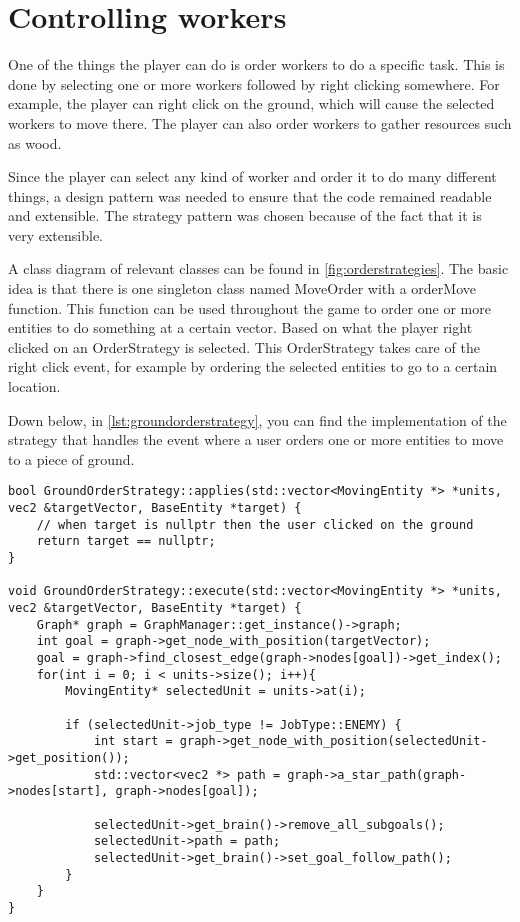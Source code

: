 \section{Controlling workers}

One of the things the player can do is order workers to do a specific task.
This is done by selecting one or more workers followed by right clicking
somewhere. For example, the player can right click on the ground, which will
cause the selected workers to move there. The player can also order workers
to gather resources such as wood.

Since the player can select any kind of worker and order it to do many
different things, a design pattern was needed to ensure that the code
remained readable and extensible. The strategy pattern was chosen because of
the fact that it is very extensible.

A class diagram of relevant classes can be found in
\cref{fig:orderstrategies}. The basic idea is that there is one singleton
class named MoveOrder with a orderMove function. This function can be used
throughout the game to order one or more entities to do something at a
certain vector. Based on what the player right clicked on an OrderStrategy
is selected. This OrderStrategy takes care of the right click event, for
example by ordering the selected entities to go to a certain location.

Down below, in \cref{lst:groundorderstrategy}, you can find the implementation of
the strategy that handles the event where a user orders one or more entities
to move to a piece of ground.
\\
\begin{lstlisting}[caption={GroundOrderStrategy implementation.},
label={lst:groundorderstrategy}]
bool GroundOrderStrategy::applies(std::vector<MovingEntity *> *units, vec2 &targetVector, BaseEntity *target) {
    // when target is nullptr then the user clicked on the ground
    return target == nullptr;
}

void GroundOrderStrategy::execute(std::vector<MovingEntity *> *units, vec2 &targetVector, BaseEntity *target) {
    Graph* graph = GraphManager::get_instance()->graph;
    int goal = graph->get_node_with_position(targetVector);
    goal = graph->find_closest_edge(graph->nodes[goal])->get_index();
    for(int i = 0; i < units->size(); i++){
        MovingEntity* selectedUnit = units->at(i);

        if (selectedUnit->job_type != JobType::ENEMY) {
            int start = graph->get_node_with_position(selectedUnit->get_position());
            std::vector<vec2 *> path = graph->a_star_path(graph->nodes[start], graph->nodes[goal]);

            selectedUnit->get_brain()->remove_all_subgoals();
            selectedUnit->path = path;
            selectedUnit->get_brain()->set_goal_follow_path();
        }
    }
}
\end{lstlisting}
